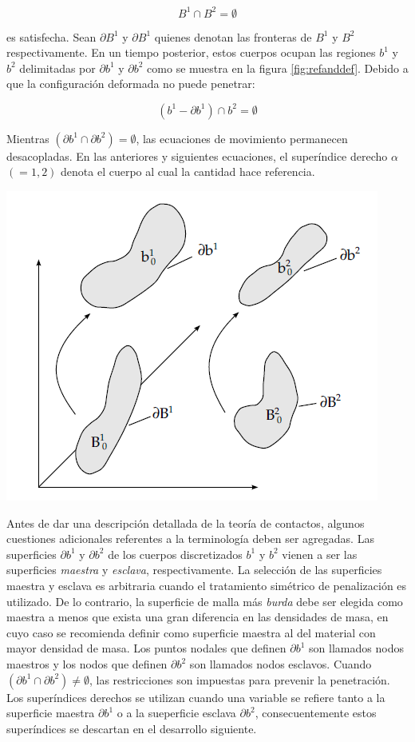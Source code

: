 $$
B^1 \cap B^2 = \emptyset
$$

es satisfecha. Sean $\partial B^1$ y $\partial B^1$ quienes denotan las fronteras de $B^1$ y $B^2$ 
respectivamente. En un tiempo posterior, estos cuerpos ocupan las regiones $b^1$ y $b^2$ delimitadas 
por $\partial b^1$ y $\partial b^2$ como se muestra en la figura \ref{fig:refanddef}. Debido a que la 
configuración deformada no puede penetrar:

$$
\left( b^1 - \partial b^1 \right) \cap b^2 = \emptyset
$$

Mientras $\left( \partial b^1 \cap \partial b^2 \right) = \emptyset$, las ecuaciones de movimiento 
permanecen desacopladas. En las anteriores y siguientes ecuaciones, el superíndice derecho $\alpha$ 
$(=1,2)$ denota el cuerpo al cual la cantidad hace referencia.

\begin{center}
\includegraphics[scale=0.6]{src/ch2/ref_and_def.png}
\label{fig:refanddef}
\end{center}

Antes de dar una descripción detallada de la teoría de contactos, algunos cuestiones adicionales 
referentes a la terminología deben ser agregadas. Las superficies $\partial b^1$ y $\partial b^2$ 
de los cuerpos discretizados $b^1$ y $b^2$ vienen a ser las superficies \textit{maestra} 
y \textit{esclava}, respectivamente. La selección de las superficies maestra y esclava es 
arbitraria cuando el tratamiento simétrico de penalización es utilizado. De lo contrario, 
la superficie de malla más \textit{burda} debe ser elegida como maestra a menos que 
exista una gran diferencia en las densidades de masa, en cuyo caso se recomienda definir 
como superficie maestra al del material con mayor densidad de masa. Los puntos nodales 
que definen $\partial b^1$ son llamados nodos maestros y los nodos que definen $\partial b^2$ 
son llamados nodos esclavos. Cuando $\left( \partial b^1 \cap \partial b^2 \right) \neq \emptyset$, 
las restricciones son impuestas para prevenir la penetración. Los superíndices derechos se 
utilizan cuando una variable se refiere tanto a la superficie maestra $\partial b^1$ o 
a la sueperficie esclava $\partial b^2$, consecuentemente estos superíndices se descartan 
en el desarrollo siguiente.

